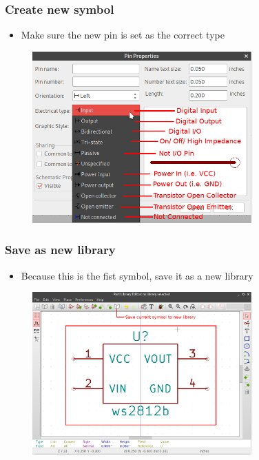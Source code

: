 \documentclass{beamer}
\begin{document}
\begin{frame}
  \frametitle{Create new symbol}
  \begin{itemize}
    \item Make sure the new pin is set as the correct type
  \end{itemize}
  \begin{figure}[H]
    \centering
    \includegraphics[width=0.75\textwidth]{images/step_02_2.png}
  \end{figure}
\end{frame}


\begin{frame}
  \frametitle{Save as new library}
  \begin{itemize}
    \item Because this is the fist symbol, save it as a new library
  \end{itemize}
  \begin{figure}[H]
    \centering
    \includegraphics[width=0.75\textwidth]{images/step_03.png}
  \end{figure}
\end{frame}
\end{document}
